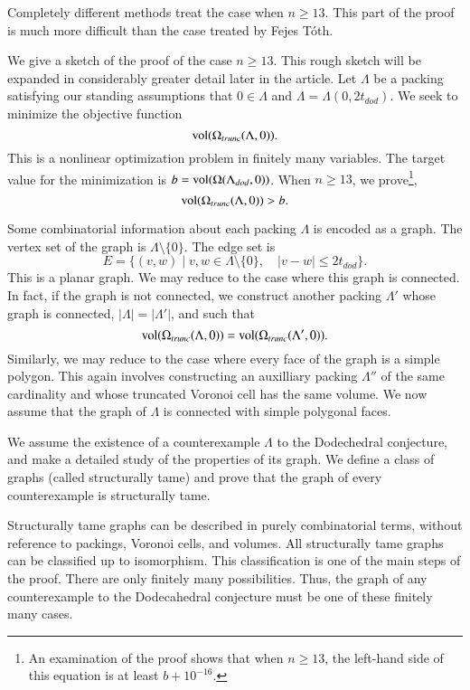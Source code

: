 Completely different methods treat the case when $n\ge 13$.  
This part of the proof is
much more difficult than the case treated by Fejes T\'oth.

We give a sketch of the proof of the case $n\ge 13$.   This
rough sketch will be expanded in considerably greater detail later
in the article.
Let $\Lambda$ be a packing satisfying our standing assumptions
that $0\in\Lambda$ and $\Lambda = \Lambda(0,2t_{dod})$.
We seek to minimize the objective function 
$$
{\operatorname{vol}}(\Omega_{trunc}(\Lambda,0)).
$$
This is a nonlinear optimization problem in finitely many variables.
The target value for the minimization is $b={\operatorname{vol}}(\Omega(\Lambda_{dod},0))$.  When $n\ge 13$, we prove\footnote{An examination of the proof shows that when $n\ge13$, the left-hand side of this
equation is at least $b+10^{-16}$.},
   $$
   {\operatorname{vol}}(\Omega_{trunc}(\Lambda,0))  > b.
   $$



Some combinatorial information about each packing $\Lambda$ is encoded
as a  graph.  The vertex set of the graph is $\Lambda\setminus\{0\}$.
The edge set is 
  $$
  E = \{(v,w) \mid v,w\in\Lambda\setminus\{0\},\quad   |v-w| \le 2t_{dod}\}.
  $$
This is a planar graph.  
We may reduce to the case where this graph is connected.  In fact,
if the graph is not connected, we construct another packing
$\Lambda'$ whose graph is connected, $|\Lambda|=|\Lambda'|$, 
and such that
$$
   {\operatorname{vol}}(\Omega_{trunc}(\Lambda,0)) = {\operatorname{vol}}(\Omega_{trunc}(\Lambda',0)). 
$$
Similarly, we may reduce to the case where every face of the graph
is a simple polygon.  This again involves constructing an auxilliary 
packing $\Lambda''$ of the same cardinality and whose  truncated Voronoi cell has the same volume.  We now assume that the graph of $\Lambda$ is 
connected with simple polygonal faces.

We assume the existence of a counterexample $\Lambda$ to the Dodechedral
conjecture, and make a detailed study of the properties of its
graph.  We define a class of graphs (called structurally tame) and
prove that the graph of every counterexample is structurally tame.

Structurally tame graphs can be described in purely combinatorial
terms, without reference to packings, Voronoi cells, and volumes.
All structurally tame graphs can be classified up to isomorphism.
This classification is one of the main steps of the proof.
There are only finitely many possibilities.  Thus, the graph
of any counterexample
to the Dodecahedral conjecture must be one of these finitely
many cases.


